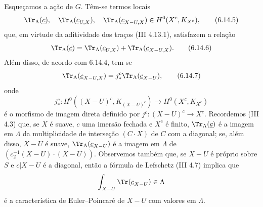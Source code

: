 Esqueçamos a ação de $G$. Têm-se termos locais
\begin{equation}
\Tr_{\Lambda}(\underline c),\quad
\Tr_{\Lambda}(\underline c_{U,X}),\quad
\Tr_{\Lambda}(\underline c_{X-U,X})
\in H^0(X^c,K_{X^c}),
\tag{6.14.5}
\end{equation}
que, em virtude da aditividade dos traços (III 4.13.1), satisfazem a relação
\begin{equation}
\Tr_{\Lambda}(\underline c)
=
\Tr_{\Lambda}(\underline c_{U,X})
+
\Tr_{\Lambda}(\underline c_{X-U,X}).
\tag{6.14.6}
\end{equation}
Além disso, de acordo com 6.14.4, tem-se
\begin{equation}
\Tr_{\Lambda}(\underline c_{X-U,X})
=
j_*^c\Tr_{\Lambda}(\underline c_{X-U}),
\tag{6.14.7}
\end{equation}
onde
\[
j_*^c:H^0((X-U)^c,K_{(X-U)^c})\longrightarrow H^0(X^c,K_{X^c})
\]
é o morfismo de imagem direta definido por $j^c:(X-U)^c\to X^c$. Recordemos (III 4.3) que, se $X$ é suave, $c$ uma imersão fechada e $X^c$ é finito, $\Tr_{\Lambda}(\underline c)$ é a imagem em $\Lambda$ da multiplicidade de interseção $(C\cdot X)$ de $C$ com a diagonal; se, além disso, $X-U$ é suave, $\Tr_{\Lambda}(\underline c_{X-U})$ é a imagem em $\Lambda$ de $(c_2^{-1}(X-U)\cdot(X-U))$. Observemos também que, se $X-U$ é próprio sobre $S$ e $c|X-U$ é a diagonal, então a fórmula de Lefschetz (III 4.7) implica que
\[
\int_{X-U}\Tr(\underline c_{X-U})\in\Lambda
\]
é a característica de Euler--Poincaré de $X-U$ com valores em $\Lambda$.
